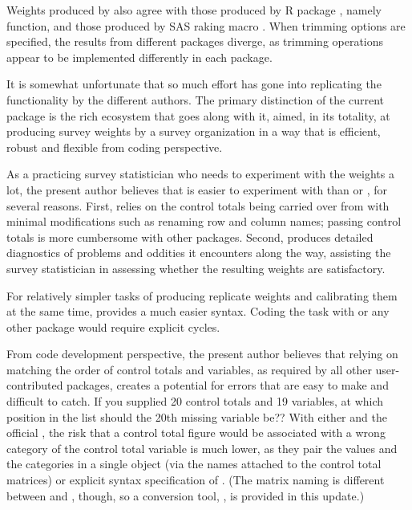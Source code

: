 \begin{stlog}
\nullskip
\end{stlog}


Weights produced by  also agree with those produced by R package
 \citep{lumley:2010,lumley:2018:svy334},
namely  function,
and those produced by SAS raking macro 
\citep{izrael:batt:batt:ball:2017}. When trimming options are specified,
the results from different packages diverge, as trimming operations appear
to be implemented differently in each package.

It is somewhat unfortunate that so much effort has gone into replicating
the functionality by the different authors. The primary distinction of the current
 package is the rich ecosystem that goes along with it, aimed,
in its totality, at producing survey weights by a survey organization in
a way that is efficient, robust and flexible from coding perspective.

As a practicing survey statistician who needs to experiment
with the weights a lot, the present author believes that 
is easier to experiment with than  or , for several reasons.
First,  relies on the control totals being carried over from 
with minimal modifications such as renaming row and column names;
passing control totals is more cumbersome with other packages.
Second,  produces detailed diagnostics of problems and oddities
it encounters along the way, assisting the survey statistician in assessing whether
the resulting weights are satisfactory. 

For relatively simpler tasks of producing
replicate weights and calibrating them at the same time,  provides
a much easier syntax. Coding the task with  or any other package would
require explicit cycles.

From code development perspective, the present author believes that relying
on matching the order of control
totals and variables, as required by all other user-contributed packages,
creates a potential for errors that are easy to make and difficult to catch.
If you supplied 20 control totals and 19 variables, at which position in the list 
should the 20th missing variable be??
With either  and the official , the risk
that a control total figure would be associated with a wrong category of the control
total variable is much lower, as they pair the values and the categories
in a single object (via the names attached to the control total matrices)
or explicit syntax  specification
of .
(The matrix naming is different between  and , though,
so a conversion tool, , is provided in this update.)


